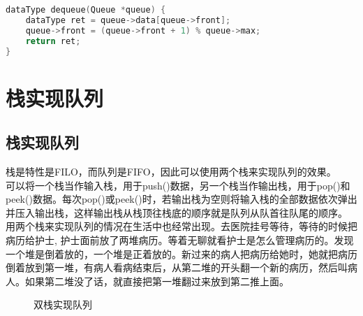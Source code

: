 \vspace{0.5cm}


\begin{lstlisting}[language=C]
dataType dequeue(Queue *queue) {
    dataType ret = queue->data[queue->front];
    queue->front = (queue->front + 1) % queue->max;
    return ret;
}
\end{lstlisting}

\newpage

\section{栈实现队列}

\subsection{栈实现队列}

栈是特性是FILO，而队列是FIFO，因此可以使用两个栈来实现队列的效果。\\

可以将一个栈当作输入栈，用于push()数据，另一个栈当作输出栈，用于pop()和peek()数据。每次pop()或peek()时，若输出栈为空则将输入栈的全部数据依次弹出并压入输出栈，这样输出栈从栈顶往栈底的顺序就是队列从队首往队尾的顺序。\\

用两个栈来实现队列的情况在生活中也经常出现。去医院挂号等待，等待的时候把病历给护士, 护士面前放了两堆病历。等着无聊就看护士是怎么管理病历的。发现一个堆是倒着放的，一个堆是正着放的。新过来的病人把病历给她时，她就把病历倒着放到第一堆，有病人看病结束后，从第二堆的开头翻一个新的病历，然后叫病人。如果第二堆没了话，就直接把第一堆翻过来放到第二推上面。

\begin{figure}[H]
	\centering
	\caption{双栈实现队列}
\end{figure}


